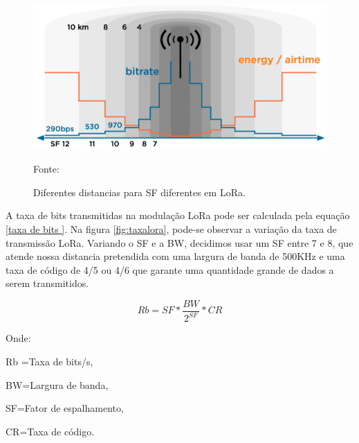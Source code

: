 \begin{figure}[H]
  \centering
  \includegraphics[scale=0.7]{figuras/SFdistanci.png}
  \caption{Diferentes distancias para SF diferentes em LoRa. }
 { \footnotesize Fonte:\cite{lorasf}} 
  \label{fig:sfloraDISTANCIA}
\end{figure}


\par A taxa de bits transmitidas na modulação LoRa pode ser calculada pela equação \ref{taxa de bits }. Na figura \ref{fig:taxalora}, pode-se observar a variação da taxa de transmissão LoRa. Variando o SF e a BW, decidimos usar um SF entre 7 e 8, que atende nossa distancia pretendida com uma largura de banda de 500KHz e uma taxa de código de 4/5 ou 4/6 que garante uma quantidade grande de dados a serem transmitidos.  

\begin{center}
\begin{equation}
 \label{taxa de bits }
 Rb =SF  *  \frac{BW} {2^{SF}}  * CR
 \end{equation}

 \end{center}
Onde:
\par Rb =Taxa de bits/s,
\par BW=Largura de banda,
\par SF=Fator de espalhamento,
\par CR=Taxa de código.


